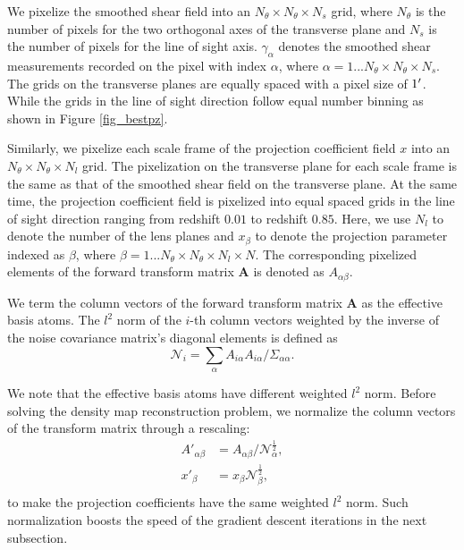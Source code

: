 \documentclass[twocolumn]{aastex63}
\begin{document}
We pixelize the smoothed shear field into an $N_\theta \times N_\theta \times
N_s$ grid, where $N_\theta$ is the number of pixels for the two orthogonal axes
of the transverse plane and $N_s$ is the number of pixels for the line of sight
axis. $\gamma_{\alpha}$ denotes the smoothed shear measurements recorded on the
pixel with index $\alpha$, where $\alpha=1...N_\theta \times N_\theta \times
N_s$. The grids on the transverse planes are equally spaced with a pixel size
of $1\mbox{$^\prime$}$. While the grids in the line of sight direction follow
equal number binning as shown in Figure \ref{fig_bestpz}.

Similarly, we pixelize each scale frame of the projection coefficient field $x$
into an $N_\theta \times N_\theta \times N_l$ grid. The pixelization on the
transverse plane for each scale frame is the same as that of the
smoothed shear field on the transverse plane. At the same time, the projection
coefficient field is pixelized into equal spaced grids in the line of sight
direction ranging from redshift $0.01$ to redshift $0.85$. Here, we use $N_l$
to denote the number of the lens planes and $x_{\beta}$ to denote the
projection parameter indexed as $\beta$, where $\beta=1...N_\theta \times
N_\theta \times N_l \times N$. The corresponding pixelized elements of the
forward transform matrix $\mathbf{A}$ is denoted as $A_{\alpha\beta}$.

We term the column vectors of the forward transform matrix $\mathbf{A}$ as the
effective basis atoms. The $l^2$ norm of the $i$-th column vectors weighted by
the inverse of the noise covariance matrix's diagonal elements is defined as
\begin{equation}
\mathcal{N}_{i}=\sum_\alpha A_{i\alpha}A_{i\alpha}/\Sigma_{\alpha\alpha}.
\end{equation}

We note that the effective basis atoms have different weighted $l^2$ norm.
Before solving the density map reconstruction problem, we normalize the column
vectors of the transform matrix through a rescaling:
\begin{equation}
\begin{split}
A'_{\alpha\beta}&=A_{\alpha\beta}/\mathcal{N}_{\alpha}^{\frac{1}{2}},\\
x'_{\beta}&=x_{\beta}\mathcal{N}_{\beta}^{\frac{1}{2}},\\
\end{split}
\end{equation}
to make the projection coefficients have the same weighted $l^2$ norm.
Such normalization boosts the speed of the gradient descent iterations
in the next subsection.
\end{document}
